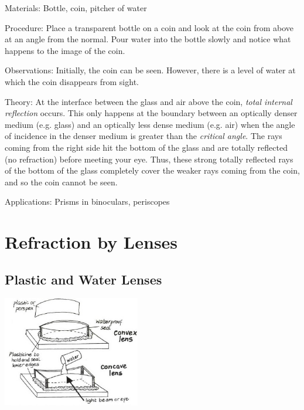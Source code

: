 \begin{multicols}{2}
\begin{description*}
\item[Materials:]{Bottle, coin, pitcher of water}
\item[Procedure:]{Place a transparent bottle on a coin and look at the coin from above at an angle from the normal. Pour water into the bottle slowly and notice what happens to the image of the coin.}
\item[Observations:]{Initially, the coin can be seen. However, there is a level of water at which the coin disappears from sight.}
\item[Theory:]{At the interface between the glass and air above the coin, \emph{total internal reflection} occurs. This only happens at the boundary between an optically denser medium (e.g. glass) and an optically less dense medium (e.g. air) when the angle of incidence in the denser medium is greater than the \emph{critical angle}. The rays coming from the right side hit the bottom of the glass and are totally reflected (no refraction) before meeting your eye. Thus, these strong totally reflected rays of the bottom of the glass completely cover the weaker rays coming from the coin, and so the coin cannot be seen.}
\item[Applications:]{Prisms in binoculars, periscopes}
\end{description*}


\section*{Refraction by Lenses}


\subsection{Plastic and Water Lenses}

\begin{center}
\includegraphics[width=0.45\textwidth]{./img/vso/lenses.jpg}
\end{center}


\end{multicols}
